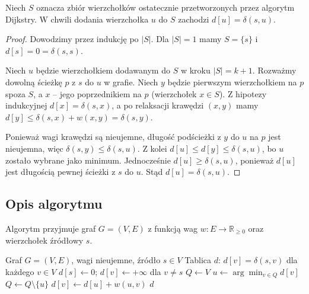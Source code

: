 \begin{lemat}
\label{lem:dijkstra-inv}
Niech $S$ oznacza zbiór wierzchołków ostatecznie przetworzonych
przez algorytm Dijkstry. W chwili dodania wierzchołka $u$ do $S$
zachodzi $d[u] = \delta(s, u)$.
\end{lemat}

\begin{proof}
Dowodzimy przez indukcję po $|S|$. Dla $|S| = 1$ mamy $S = \{s\}$
i $d[s] = 0 = \delta(s, s)$.

Niech $u$ będzie wierzchołkiem dodawanym do $S$ w kroku $|S| = k+1$.
Rozważmy dowolną ścieżkę $p$ z $s$ do $u$ w grafie. Niech $y$ będzie
pierwszym wierzchołkiem na $p$ spoza $S$, a $x$ -- jego poprzednikiem
na $p$ (wierzchołek $x \in S$). Z hipotezy indukcyjnej
$d[x] = \delta(s, x)$, a po relaksacji krawędzi $(x, y)$ mamy
$d[y] \leq \delta(s, x) + w(x, y) = \delta(s, y)$.

Ponieważ wagi krawędzi są nieujemne, długość podścieżki z $y$ do $u$
na $p$ jest nieujemna, więc $\delta(s, y) \leq \delta(s, u)$.
Z kolei $d[u] \leq d[y] \leq \delta(s, u)$, bo $u$ zostało
wybrane jako minimum. Jednocześnie $d[u] \geq \delta(s, u)$,
ponieważ $d[u]$ jest długością pewnej ścieżki z $s$ do $u$.
Stąd $d[u] = \delta(s, u)$.
\end{proof}

\subsection{Opis algorytmu}

Algorytm przyjmuje graf $G = (V, E)$ z funkcją wag
$w \colon E \to \mathbb{R}_{\geq 0}$ oraz wierzchołek źródłowy $s$.

\begin{algorithm}[H]
\caption{Algorytm Dijkstry -- najkrótsze ścieżki z jednego źródła}
\begin{algorithmic}[1]
\Require Graf $G = (V, E)$, wagi nieujemne,
         źródło $s \in V$
\Ensure Tablica $d$: $d[v] = \delta(s, v)$ dla każdego $v \in V$
\State $d[s] \leftarrow 0$;
       $d[v] \leftarrow +\infty$ dla $v \neq s$
\State $Q \leftarrow V$
  \State $u \leftarrow \arg\min_{v \in Q} d[v]$
  \State $Q \leftarrow Q \setminus \{u\}$
      \State $d[v] \leftarrow d[u] + w(u, v)$
    \EndIf
  \EndFor
\EndWhile
\State \Return $d$
\end{algorithmic}
\end{algorithm}


